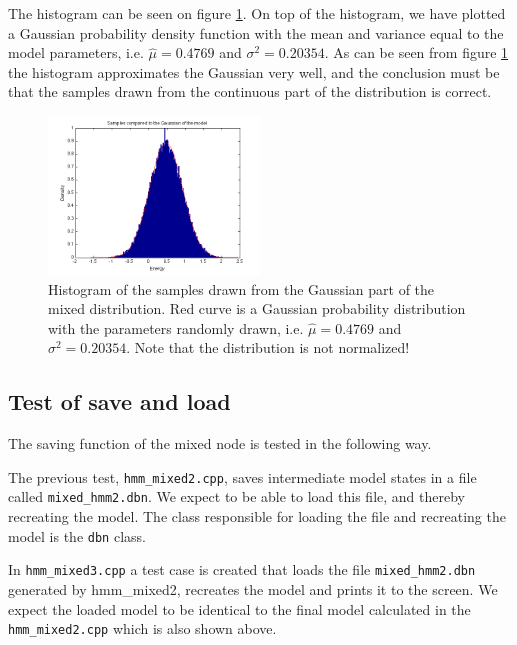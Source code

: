 \documentclass[10pt, journal, compsoc, a4paper]{IEEEtran}
\begin{document}
The histogram can be seen on figure \ref{fig1}. On top of the histogram, we have plotted a Gaussian probability density function with the mean and variance equal to the model parameters, i.e. $\hat{\mu} = 0.4769$ and $\sigma^2 = 0.20354$. As can be seen from figure \ref{fig1} the histogram approximates the Gaussian very well, and the conclusion must be that the samples drawn from the continuous part of the distribution is correct.

\begin{figure}
\centering
\includegraphics[width=0.5\textwidth]{figures/fig1.png}
\caption{Histogram of the samples drawn from the Gaussian part of the mixed distribution. Red curve is a Gaussian probability distribution with the parameters randomly drawn, i.e. $\hat{\mu} = 0.4769$ and $\sigma^2 = 0.20354$. Note that the distribution is not normalized!}
\label{fig1}
\end{figure}




\subsection{Test of save and load} %
\label{sub:test_of_save_and_load}
The saving function of the mixed node is tested in the following way. 

The previous test, \texttt{hmm\_mixed2.cpp}, saves intermediate model states in a file called \texttt{mixed\_hmm2.dbn}. We expect to be able to load this file, and thereby recreating the model. The class responsible for loading the file and recreating the model is the \texttt{dbn} class. 

In \texttt{hmm\_mixed3.cpp} a test case is created that loads the file \texttt{mixed\_hmm2.dbn} generated by hmm\_mixed2, recreates the model and prints it to the screen. We expect the loaded model to be identical to the final model calculated in the \texttt{hmm\_mixed2.cpp} which is also shown above.
\end{document}
